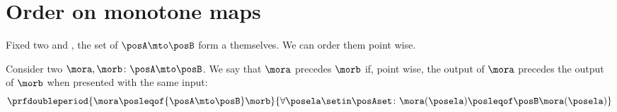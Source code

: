 \section{Order on monotone maps}

Fixed two  \posA and \posB, the set of  $\posA \mto \posB$ form a  themselves.
We can order them point wise.

\begin{ctdefinition}
    \label{def:order-monotone-maps}
    Consider two  $\mora,\morb\colon\posA\mto\posB$.
    We say that $\mora$ precedes $\morb$ if, point wise, the output of $\mora$ precedes the output of $\morb$ when presented with the same input:
    \begin{equation}
        \prfdoubleperiod{
            \mora \posleqof{\posA\mto\posB} \morb
        }{
            \forall \posela\setin\posAset \colon \mora(\posela) \posleqof\posB \mora(\posela)
        }
    \end{equation}
\end{ctdefinition}

